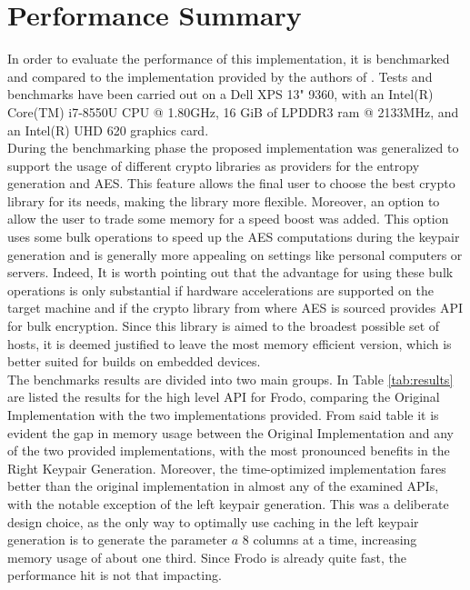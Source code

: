 \section{Performance Summary}
In order to evaluate the performance of this implementation, it is benchmarked and compared to the implementation provided by the authors of \cite{frodo}. Tests and benchmarks have been carried out on a Dell XPS 13" 9360, with an Intel(R) Core(TM) i7-8550U CPU @ 1.80GHz, 16 GiB of LPDDR3 ram @ 2133MHz, and an Intel(R) UHD 620 graphics card.\\
During the benchmarking phase the proposed implementation was generalized to support the usage of different crypto libraries as providers for the entropy generation and AES. This feature allows the final user to choose the best crypto library for its needs, making the library more flexible. Moreover, an option to allow the user to trade some memory for a speed boost was added. This option uses some bulk operations to speed up the AES computations during the keypair generation and is generally more appealing on settings like personal computers or servers. Indeed, It is worth pointing out that the advantage for using these bulk operations is only substantial if hardware accelerations are supported on the target machine and if the crypto library from where AES is sourced provides API for bulk encryption. Since this library is aimed to the broadest possible set of hosts, it is deemed justified to leave the most memory efficient version, which is better suited for builds on embedded devices.\\
The benchmarks results are divided into two main groups. In Table \ref{tab:results} are listed the results for the high level API for Frodo, comparing the Original Implementation with the two implementations provided. From said table it is evident the gap in memory usage between the Original Implementation and any of the two provided implementations, with the most pronounced benefits in the Right Keypair Generation. Moreover, the time-optimized implementation fares better than the original implementation in almost any of the examined APIs, with the notable exception of the left keypair generation. This was a deliberate design choice, as the only way to optimally use caching in the left keypair generation is to generate the parameter $a$ $8$ columns at a time, increasing memory usage of about one third. Since Frodo is already quite fast, the performance hit is not that impacting.\\
